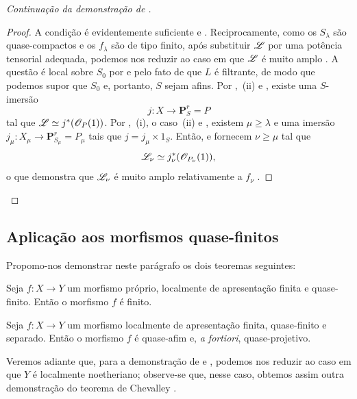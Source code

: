 \begin{proof}[Continuação da demonstração de ]
\begin{proof}
A condição é evidentemente suficiente  e . Reciprocamente, como os $S_\lambda$ são quase-compactos e os $f_\lambda$ são de tipo finito, após substituir $\mathscr{L}$ por uma potência tensorial adequada, podemos nos reduzir ao caso em que $\mathscr{L}$ é muito amplo . A questão é local sobre $S_0$ por  e pelo fato de que $L$ é filtrante, de modo que podemos supor que $S_0$ e, portanto, $S$ sejam afins. Por ,~(ii) e , existe uma $S$-imersão
\[
  j:X\longrightarrow\mathbf{P}^r_S=P
\]
tal que $\mathscr{L}\simeq j^*(\mathscr{O}_P(1))$. Por ,~(i), o caso~(ii) e , existem $\mu\geqslant\lambda$ e uma imersão $j_\mu:X_\mu\to\mathbf{P}^r_{S_\mu}=P_\mu$ tais que $j=j_\mu\times1_S$. Então,  e  fornecem $\nu\geqslant\mu$ tal que
\[
  \mathscr{L}_\nu\simeq j_\nu^*(\mathscr{O}_{P_\nu}(1)),
\]
o que demonstra que $\mathscr{L}_\nu$ é muito amplo relativamente a $f_\nu$ .
\end{proof}
\end{proof}

\subsection{Aplicação aos morfismos quase-finitos}
\label{subsection:IV.8.11}
\label{IV.8.11}

Propomo-nos demonstrar neste parágrafo os dois teoremas seguintes:

\begin{theorem}[8.11.1]
\label{IV.8.11.1}
Seja $f:X\to Y$ um morfismo próprio, localmente de apresentação finita e quase-finito.
Então o morfismo $f$ é finito.
\end{theorem}

\begin{theorem}[8.11.2]
\label{IV.8.11.2}
Seja $f:X\to Y$ um morfismo localmente de apresentação finita, quase-finito e separado.
Então o morfismo $f$ é quase-afim e, \emph{a fortiori}, quase-projetivo.
\end{theorem}

\begin{remark}[8.11.3]
\label{IV.8.11.3}
Veremos adiante que, para a demonstração de  e , podemos nos reduzir ao caso em que $Y$ é localmente noetheriano; observe-se que, nesse caso, obtemos assim outra demonstração do teorema de Chevalley .
\end{remark}


